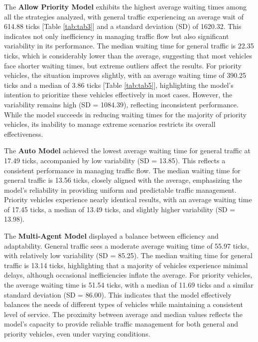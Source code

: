 \documentclass[sigconf]{acmart}
\begin{document}
The \textbf{Allow Priority Model} exhibits the highest average waiting times among all the strategies analyzed, with general traffic experiencing an average wait of 614.88 ticks [Table \ref{tab:tab3}] and a standard deviation (SD) of 1620.32. This indicates not only inefficiency in managing traffic flow but also significant variability in its performance. The median waiting time for general traffic is 22.35 ticks, which is considerably lower than the average, suggesting that most vehicles face shorter waiting times, but extreme outliers affect the results. For priority vehicles, the situation improves slightly, with an average waiting time of 390.25 ticks and a median of 3.86 ticks [Table \ref{tab:tab5}], highlighting the model's intention to prioritize these vehicles effectively in most cases. However, the variability remains high (SD = 1084.39), reflecting inconsistent performance. While the model succeeds in reducing waiting times for the majority of priority vehicles, its inability to manage extreme scenarios restricts its overall effectiveness.

The \textbf{Auto Model} achieved the lowest average waiting time for general traffic at 17.49 ticks, accompanied by low variability (SD = 13.85). This reflects a consistent performance in managing traffic flow. The median waiting time for general traffic is 13.56 ticks, closely aligned with the average, emphasizing the model's reliability in providing uniform and predictable traffic management. Priority vehicles experience nearly identical results, with an average waiting time of 17.45 ticks, a median of 13.49 ticks, and slightly higher variability (SD = 13.98).

The \textbf{Multi-Agent Model} displayed a balance between efficiency and adaptability. General traffic sees a moderate average waiting time of 55.97 ticks, with relatively low variability (SD = 85.25). The median waiting time for general traffic is 13.14 ticks, highlighting that a majority of vehicles experience minimal delays, although occasional inefficiencies inflate the average. For priority vehicles, the average waiting time is 51.54 ticks, with a median of 11.69 ticks and a similar standard deviation (SD = 86.00). This indicates that the model effectively balances the needs of different types of vehicles while maintaining a consistent level of service. The proximity between average and median values reflects the model's capacity to provide reliable traffic management for both general and priority vehicles, even under varying conditions.
\end{document}
